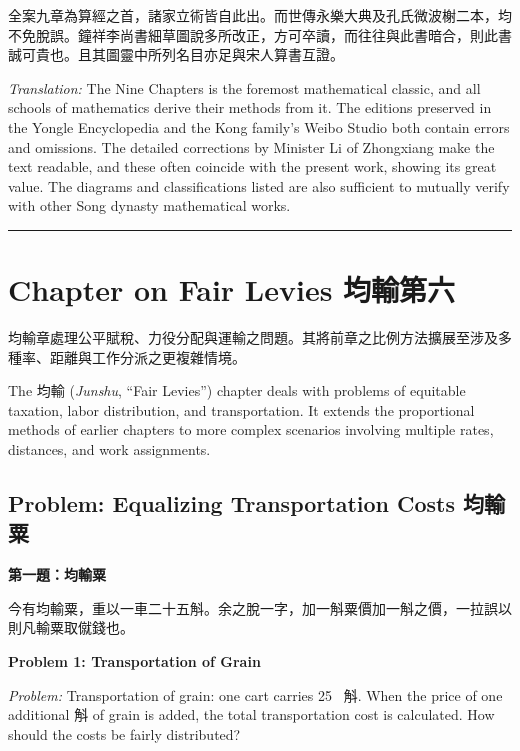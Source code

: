 \documentclass[11pt,a4paper]{article}
\newcommand{\longline}{\noindent\rule{\textwidth}{0.4pt}}
\newcommand{\zh}[1]{{\CJKfamily{\CJKrmdefault} #1}}
\newenvironment{chside}{%
  \begin{minipage}[t]{0.48\textwidth}%
  \setlength{\parindent}{1.5em}%
  \linespread{1.25}\selectfont%
  \small%
}{%
  \end{minipage}%
}
\newenvironment{enside}{%
  \hfill\begin{minipage}[t]{0.48\textwidth}%
  \setlength{\parindent}{1em}%
  \linespread{1.15}\selectfont%
  \small%
}{%
  \end{minipage}%
}
\begin{document}
\medskip

\noindent\begin{chside}
\zh{全案九章為算經之首，諸家立術皆自此出。而世傳永樂大典及孔氏微波榭二本，均不免脫誤。鐘祥李尚書細草圖說多所改正，方可卒讀，而往往與此書暗合，則此書誠可貴也。且其圖靈中所列名目亦足與宋人算書互證。}
\end{chside}%
\begin{enside}
\textit{Translation:} The Nine Chapters is the foremost mathematical classic,
and all schools of mathematics derive their methods from it. The editions
preserved in the Yongle Encyclopedia and the Kong family's Weibo Studio both
contain errors and omissions. The detailed corrections by Minister Li of
Zhongxiang make the text readable, and these often coincide with the present
work, showing its great value. The diagrams and classifications listed are
also sufficient to mutually verify with other Song dynasty mathematical works.
\end{enside}

\vspace{1cm}
\longline

\newpage

\section{Chapter on Fair Levies \zh{均輸第六}}
\label{sec:junshu}

\noindent\begin{chside}
\zh{均輸}章處理公平賦稅、力役分配與運輸之問題。其將前章之比例方法擴展至涉及多種率、距離與工作分派之更複雜情境。
\end{chside}%
\begin{enside}
The \zh{均輸} (\textit{Junshu}, ``Fair Levies'') chapter deals with problems
of equitable taxation, labor distribution, and transportation. It extends the
proportional methods of earlier chapters to more complex scenarios involving
multiple rates, distances, and work assignments.
\end{enside}

\subsection{Problem: Equalizing Transportation Costs \zh{均輸粟}}

\noindent\begin{chside}
\noindent\textbf{第一題：均輸粟}

\zh{今有均輸粟，重以一車二十五斛。余之脫一字，加一斛粟價加一斛之價，一拉誤以則凡輸粟取僦錢也。}
\end{chside}%
\begin{enside}
\noindent\textbf{Problem 1: Transportation of Grain}

\textit{Problem:} Transportation of grain: one cart carries 25~\zh{斛}.
When the price of one additional \zh{斛} of grain is added, the total
transportation cost is calculated. How should the costs be fairly distributed?
\end{enside}
\end{document}
